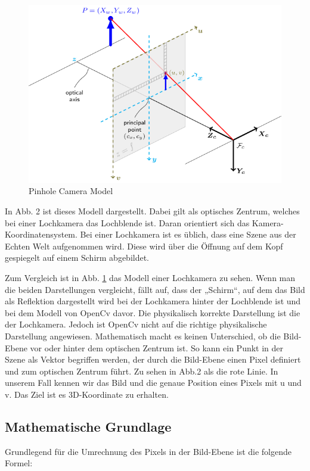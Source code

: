 	\begin{figure}[h]
		\centering
		\includegraphics[width=0.7\linewidth]{img/grundlagen/pinhole_camera_model.png}
		\caption[test]{Pinhole Camera Model}
		\label{fig:pinhole-camera-model}
	\end{figure}

	In Abb. 2 ist dieses Modell dargestellt. Dabei gilt  als optisches Zentrum, welches bei einer Lochkamera das Lochblende ist. Daran orientiert sich das Kamera-Koordinatensystem. Bei einer Lochkamera ist es üblich, dass eine Szene aus der Echten Welt aufgenommen wird. Diese wird über die Öffnung auf dem Kopf gespiegelt auf einem Schirm abgebildet.
	
	
	
	Zum Vergleich ist in Abb. \ref{fig:pinhole-camera-model} das Modell einer Lochkamera zu sehen. Wenn man die beiden Darstellungen vergleicht, fällt auf, dass der „Schirm“, auf dem das Bild als Reflektion dargestellt wird bei der Lochkamera hinter der Lochblende ist und bei dem Modell von OpenCv davor. Die physikalisch korrekte Darstellung ist die der Lochkamera. Jedoch ist OpenCv nicht auf die richtige physikalische Darstellung angewiesen. Mathematisch macht es keinen Unterschied, ob die Bild-Ebene vor oder hinter dem optischen Zentrum ist. So kann ein Punkt in der Szene als Vektor begriffen werden, der durch die Bild-Ebene einen Pixel definiert und zum optischen Zentrum führt. Zu sehen in Abb.2 als die rote Linie. In unserem Fall kennen wir das Bild und die genaue Position eines Pixels mit u und v. Das Ziel ist es 3D-Koordinate zu erhalten.
	
	\newpage
	
	\subsection{Mathematische Grundlage}
	Grundlegend für die Umrechnung des Pixels in der Bild-Ebene ist die folgende Formel:
	
